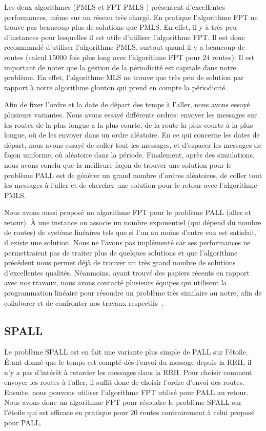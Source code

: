 \documentclass{article}
\begin{document}
    Les deux algorithmes (PMLS et FPT PMLS ) présentent d'excellentes performances, même sur un réseau très chargé.
  En pratique l'algorithme FPT ne trouve pas beaucoup plus de solutions que PMLS. En effet, il y à très peu d'instances pour lesquelles il est utile d'utiliser l'algorithme FPT.
  Il est donc recommandé d'utiliser l'algorithme PMLS, surtout quand il y a beaucoup de routes (calcul $15000$ fois plus long avec l'algorithme FPT pour $24$ routes). Il est important de noter que la gestion de la périodicité est capitale dans notre problème. En effet, l'algorithme MLS ne trouve que très peu de solution par rapport à notre algorithme glouton qui prend en compte la périodicité.

Afin de fixer l'ordre et la date de départ des temps à l'aller, nous avons essayé plusieurs variantes. Nous avons essayé différents ordres: envoyer les messages sur les routes de la plus longue a la plus courte, de la route la plus courte à la plus longue, où de les envoyer dans un ordre aléatoire. En ce qui concerne les dates de départ, nous avons essayé de coller tout les messages, et d'espacer les messages de façon uniforme, où aléatoire dans la période. Finalement, après des simulations, nous avons conclu que la meilleure façon de trouver une solution pour le problème PALL est de générer un grand nombre d'ordres aléatoires, de coller tout les messages à l'aller et de chercher une solution pour le retour avec l'algorithme PMLS.

Nous avons aussi proposé un algorithme FPT pour le problème PALL (aller et retour). À une instance on associe un nombre exponentiel (qui dépend du nombre de routes) de système linéaires tels que si l'un au moins d'entre eux est satisfait, il existe une solution. Nous ne l'avons pas implémenté car ses performances ne permettraient pas de traiter plus de quelques solutions et que l'algorithme précédent nous permet déjà de trouver un très grand nombre de solutions d'excellentes qualités. Néanmoins, ayant trouvé des papiers récents en rapport avec nos travaux, nous avons contacté plusieurs équipes qui utilisent la programmation linéaire pour résoudre un problème très similaire au notre, afin de collaborer et de confronter nos travaux respectifs~\cite{steiner2018traffic,craciunas2017formal}.


     
\subsection{SPALL}
Le problème SPALL est en fait une variante plus simple de PALL sur l'étoile. Étant donné que le temps est compté dès l'envoi du message depuis la RRH, il n'y a pas d'intérêt à retarder les messages dans la RRH. Pour choisir comment envoyer les routes à l'aller, il suffit donc de choisir l'ordre d'envoi des routes. Ensuite, nous pouvons utiliser l'algorithme FPT utilisé pour PALL au retour. Nous avons donc un algorithme FPT pour résoudre le problème SPALL sur l'étoile qui est efficace en pratique pour $20$ routes contrairement à celui proposé pour PALL.
\end{document}
